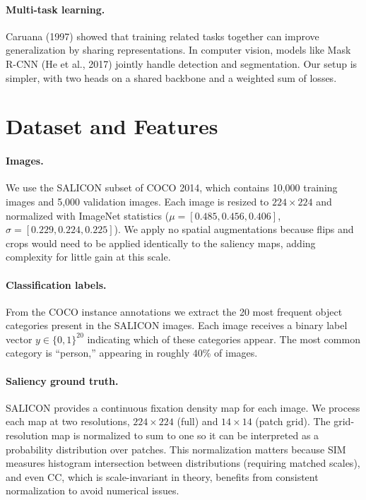 \documentclass{article}
\begin{document}
\paragraph{Multi-task learning.}
Caruana (1997) showed that training related tasks together can improve generalization by sharing representations. In computer vision, models like Mask R-CNN (He et al., 2017) jointly handle detection and segmentation. Our setup is simpler, with two heads on a shared backbone and a weighted sum of losses.

\section{Dataset and Features}

\paragraph{Images.}
We use the SALICON subset of COCO 2014, which contains 10{,}000 training images and 5{,}000 validation images. Each image is resized to $224\!\times\!224$ and normalized with ImageNet statistics ($\mu = [0.485, 0.456, 0.406]$, $\sigma = [0.229, 0.224, 0.225]$). We apply no spatial augmentations because flips and crops would need to be applied identically to the saliency maps, adding complexity for little gain at this scale.

\paragraph{Classification labels.}
From the COCO instance annotations we extract the 20 most frequent object categories present in the SALICON images. Each image receives a binary label vector $y \in \{0,1\}^{20}$ indicating which of these categories appear. The most common category is ``person,'' appearing in roughly 40\% of images.

\paragraph{Saliency ground truth.}
SALICON provides a continuous fixation density map for each image. We process each map at two resolutions, $224\!\times\!224$ (full) and $14\!\times\!14$ (patch grid). The grid-resolution map is normalized to sum to one so it can be interpreted as a probability distribution over patches. This normalization matters because SIM measures histogram intersection between distributions (requiring matched scales), and even CC, which is scale-invariant in theory, benefits from consistent normalization to avoid numerical issues.
\end{document}
